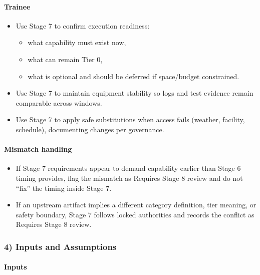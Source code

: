 \documentclass[10pt]{article}
\begin{document}
\paragraph*{Trainee}

\begin{itemize}
\item Use Stage 7 to confirm execution readiness:
  \begin{itemize}
  \item what capability must exist now,
  \item what can remain Tier 0,
  \item what is optional and should be deferred if space/budget constrained.
  \end{itemize}
\item Use Stage 7 to maintain equipment stability so logs and test evidence remain comparable across windows.
\item Use Stage 7 to apply safe substitutions when access fails (weather, facility, schedule), documenting changes per governance.
\end{itemize}

\paragraph*{Mismatch handling}

\begin{itemize}
\item If Stage 7 requirements appear to demand capability earlier than Stage 6 timing provides, flag the mismatch as Requires Stage 8 review and do not “fix” the timing inside Stage 7.
\item If an upstream artifact implies a different category definition, tier meaning, or safety boundary, Stage 7 follows locked authorities and records the conflict as Requires Stage 8 review.
\end{itemize}

\subsubsection*{4) Inputs and Assumptions}

\paragraph*{Inputs}
\end{document}

